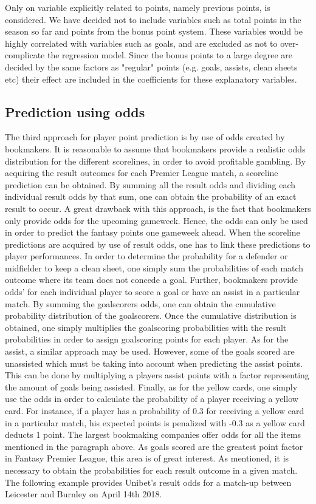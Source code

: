 Only on variable explicitly related to points, namely previous points, is considered. We have decided not to include variables such as total points in the season so far and points from the bonus point system. These variables would be highly correlated with variables such as goals, and are excluded as not to over-complicate the regression model. Since the bonus points to a large degree are decided by the same factors as "regular" points (e.g. goals, assists, clean sheets etc) their effect are included in the coefficients for these explanatory variables. 


\subsection{Prediction using odds}
The third approach for player point prediction is by use of odds created by bookmakers. It is reasonable to assume that bookmakers provide a realistic odds distribution for the different scorelines, in order to avoid profitable gambling. By acquiring the result outcomes for each Premier League match, a scoreline prediction can be obtained. By summing all the result odds and dividing each individual result odds by that sum, one can obtain the probability of an exact result to occur. A great drawback with this approach, is the fact that bookmakers only provide odds for the upcoming gameweek. Hence, the odds can only be used in order to predict the fantasy points one gameweek ahead. 
\newpar
When the scoreline predictions are acquired by use of result odds, one has to link these predictions to player performances. In order to determine the probability for a defender or midfielder to keep a clean sheet, one simply sum the probabilities of each match outcome where its team does not concede a goal. Further, bookmakers provide odds' for each individual player to score a goal or have an assist in a particular match. By summing the goalscorers odds, one can obtain the cumulative probability distribution of the goalscorers. Once the cumulative distribution is obtained, one simply multiplies the goalscoring probabilities with the result probabilities in order to assign goalscoring points for each player. As for the assist, a similar approach may be used. However, some of the goals scored are unassisted which must be taking into account when predicting the assist points. This can be done by multiplying a players assist points with a factor representing the amount of goals being assisted. Finally, as for the yellow cards, one simply use the odds in order to calculate the probability of a player receiving a yellow card. For instance, if a player has a probability of 0.3 for receiving a yellow card in a particular match, his expected points is penalized with -0.3 as a yellow card deducts 1 point. 
\newpar
The largest bookmaking companies offer odds for all the items mentioned in the paragraph above. As goals scored are the greatest point factor in Fantasy Premier League, this area is of great interest. As mentioned, it is necessary to obtain the probabilities for each result outcome in a given match. The following example provides Unibet's result odds for a match-up between Leicester and Burnley on April 14th 2018. 

